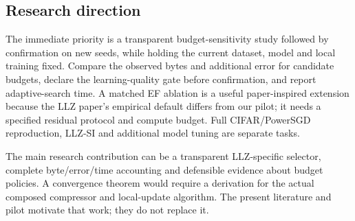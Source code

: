 \documentclass[11pt,a4paper]{article}
\begin{document}
\subsection*{Research direction}

The immediate priority is a transparent budget-sensitivity study followed by confirmation on new seeds, while holding the current dataset, model and local training fixed. Compare the observed bytes and additional error for candidate budgets, declare the learning-quality gate before confirmation, and report adaptive-search time. A matched EF ablation is a useful paper-inspired extension because the LLZ paper's empirical default differs from our pilot; it needs a specified residual protocol and compute budget. Full CIFAR/PowerSGD reproduction, LLZ-SI and additional model tuning are separate tasks.

The main research contribution can be a transparent LLZ-specific selector, complete byte/error/time accounting and defensible evidence about budget policies. A convergence theorem would require a derivation for the actual composed compressor and local-update algorithm. The present literature and pilot motivate that work; they do not replace it.

\printbibliography
\end{document}
